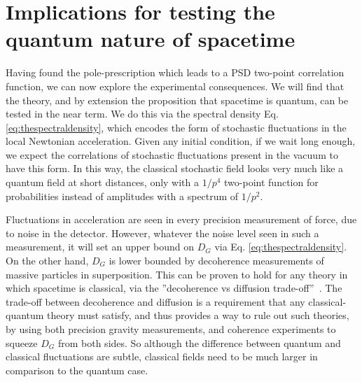 \documentclass[aps,preprintnumbers,superscriptaddress,longbibliography]{revtex4-1}
\begin{document}
\section{Implications for testing the quantum nature of spacetime }
\label{sec: exp}

Having found the pole-prescription which leads to a PSD two-point correlation function, we can now explore the experimental consequences. We will find that the theory, and by extension the proposition that spacetime is quantum, can be tested in the near term. We do this via the spectral density Eq. \eqref{eq:thespectraldensity}, which encodes the form of stochastic fluctuations in the local Newtonian acceleration. Given any initial condition, if we wait long enough, we expect the correlations of stochastic fluctuations present in the vacuum to have this form. In this way, the classical stochastic field looks very much like a quantum field at short distances, only with a $1/p^4$ two-point function for probabilities instead of amplitudes with a spectrum of $1/p^2$. 

 Fluctuations in acceleration are seen in every precision measurement of force, due to noise in the detector. However, whatever the noise level seen in such a measurement, it will set an upper bound on $D_G$ via Eq. \eqref{eq:thespectraldensity}.
 On the other hand, $D_G$ is lower bounded by decoherence measurements of massive particles in superposition. This can be proven to hold for any theory in which spacetime is classical,  via the ''decoherence vs diffusion trade-off''~\cite{oppenheim2022gravitationally}.  The trade-off between decoherence and diffusion is a requirement that any classical-quantum theory must satisfy, and thus provides a way to rule out such theories, by using both precision gravity measurements, and coherence experiments to squeeze $D_G$ from both sides. So although the difference between quantum and classical fluctuations are subtle, classical fields need to be much larger in comparison to the quantum case.
 
\end{document}
